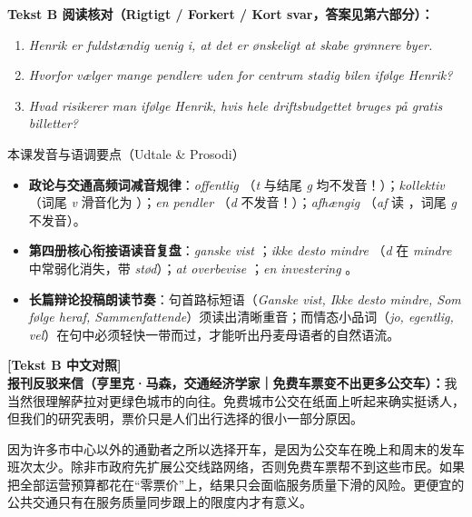 \textbf{Tekst B 阅读核对（Rigtigt / Forkert / Kort svar，答案见第六部分）：}
\begin{enumerate}
  \item \textit{Henrik er fuldstændig uenig i, at det er ønskeligt at skabe grønnere byer.} \underline{\hspace{2.2cm}}
  \item \textit{Hvorfor vælger mange pendlere uden for centrum stadig bilen ifølge Henrik?} \underline{\hspace{2.2cm}}
  \item \textit{Hvad risikerer man ifølge Henrik, hvis hele driftsbudgettet bruges på gratis billetter?} \underline{\hspace{2.2cm}}
\end{enumerate}

\begin{tipbox}{本课发音与语调要点（Udtale \& Prosodi）}
\begin{itemize}
  \item \textbf{政论与交通高频词减音规律}：\textit{offentlig} （\textit{t} 与结尾 \textit{g} 均不发音！）；\textit{kollektiv} （词尾 \textit{v} 滑音化为 ）；\textit{en pendler} （\textit{d} 不发音！）；\textit{afhængig} （\textit{af} 读 ，词尾 \textit{g} 不发音）。
  \item \textbf{第四册核心衔接语读音复盘}：\textit{ganske vist} ；\textit{ikke desto mindre} （\textit{d} 在 \textit{mindre} 中常弱化消失，带 \textit{stød}）；\textit{at overbevise} ；\textit{en investering} 。
  \item \textbf{长篇辩论投稿朗读节奏}：句首路标短语（\textit{Ganske vist, Ikke desto mindre, Som følge heraf, Sammenfattende}）须读出清晰重音；而情态小品词（\textit{jo, egentlig, vel}）在句中必须轻快一带而过，才能听出丹麦母语者的自然语流。
\end{itemize}
\end{tipbox}

\begin{transbox}
\small
\textbf{\color{NCDTeal}[Tekst B 中文对照]}\\
\textbf{报刊反驳来信（亨里克·马森，交通经济学家｜免费车票变不出更多公交车）：}我当然很理解萨拉对更绿色城市的向往。免费城市公交在纸面上听起来确实挺诱人，但我们的研究表明，票价只是人们出行选择的很小一部分原因。

因为许多市中心以外的通勤者之所以选择开车，是因为公交车在晚上和周末的发车班次太少。除非市政府先扩展公交线路网络，否则免费车票帮不到这些市民。如果把全部运营预算都花在“零票价”上，结果只会面临服务质量下滑的风险。更便宜的公共交通只有在服务质量同步跟上的限度内才有意义。
\end{transbox}

